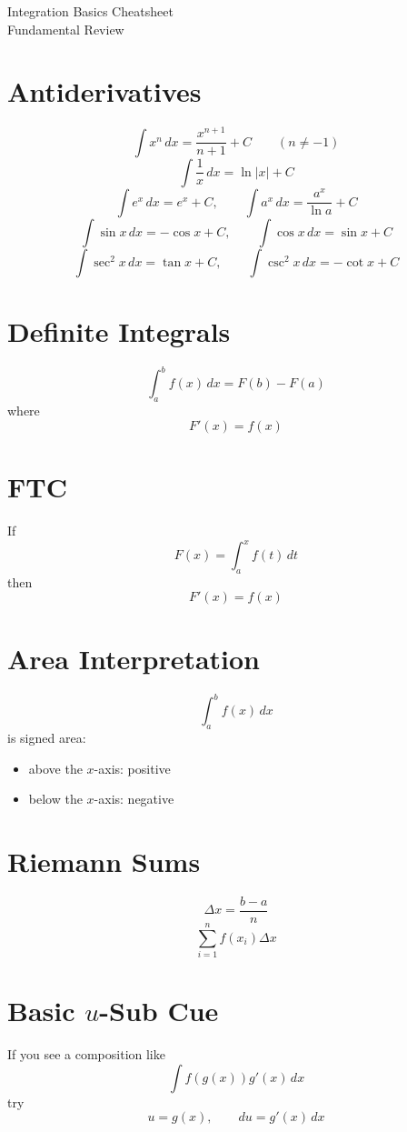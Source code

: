 \documentclass[11pt]{article}
\begin{document}
\begin{center}
{\LARGE Integration Basics Cheatsheet}\\[0.4em]
{\large Fundamental Review}
\end{center}

\section*{Antiderivatives}
\[
\int x^n\,dx=\frac{x^{n+1}}{n+1}+C\qquad (n\ne -1)
\]
\[
\int \frac{1}{x}\,dx=\ln|x|+C
\]
\[
\int e^x\,dx=e^x+C,\qquad \int a^x\,dx=\frac{a^x}{\ln a}+C
\]
\[
\int \sin x\,dx=-\cos x+C,\qquad \int \cos x\,dx=\sin x+C
\]
\[
\int \sec^2 x\,dx=\tan x+C,\qquad \int \csc^2 x\,dx=-\cot x+C
\]

\section*{Definite Integrals}
\[
\int_a^b f(x)\,dx=F(b)-F(a)
\]
where
\[
F'(x)=f(x)
\]

\section*{FTC}
If
\[
F(x)=\int_a^x f(t)\,dt
\]
then
\[
F'(x)=f(x)
\]

\section*{Area Interpretation}
\[
\int_a^b f(x)\,dx
\]
is signed area:
\begin{itemize}
  \item above the $x$-axis: positive
  \item below the $x$-axis: negative
\end{itemize}

\section*{Riemann Sums}
\[
\Delta x=\frac{b-a}{n}
\]
\[
\sum_{i=1}^n f(x_i)\Delta x
\]

\section*{Basic $u$-Sub Cue}
If you see a composition like
\[
\int f(g(x))g'(x)\,dx
\]
try
\[
u=g(x),\qquad du=g'(x)\,dx
\]
\end{document}
